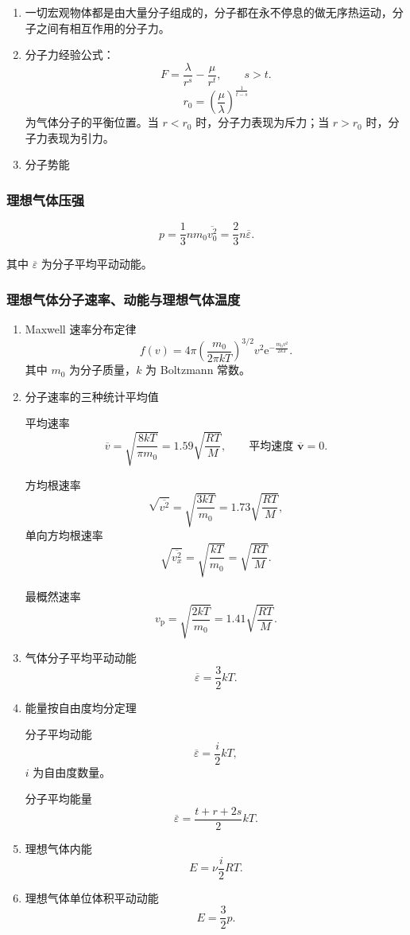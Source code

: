 \documentclass[UTF8,fontset=fandol,zihao=5]{ctexart}
\newcommand{\ee}{\mathrm{e}}
\newcommand{\vect}[1]{\bm{#1}}
\begin{document}
\begin{enumerate}
  \item 一切宏观物体都是由大量分子组成的，分子都在永不停息的做无序热运动，分子之间有相互作用的分子力。
  \item 分子力经验公式：
  \[
    F=\frac{\lambda}{r^s}-\frac{\mu}{r^t},
    \qquad s>t.
  \]
  \[
    r_0=\left(\frac{\mu}{\lambda}\right)^{\frac{1}{t-s}}
  \]
  为气体分子的平衡位置。当 \(r<r_0\) 时，分子力表现为斥力；当 \(r>r_0\) 时，分子力表现为引力。
  \item 分子势能
\end{enumerate}

\subsubsection{理想气体压强}

\[
  p=\frac13nm_0\overline{v_0^2}=\frac23n\overline\varepsilon.
\]

其中 \(\overline\varepsilon\) 为分子平均平动动能。

\subsubsection{理想气体分子速率、动能与理想气体温度}

\begin{enumerate}
  \item Maxwell 速率分布定律
  \[
    f(v)=4\pi\left(\frac{m_0}{2\pi kT}\right)^{3/2}v^2\ee^{-\frac{m_0v^2}{2kT}}.
  \]
  其中 \(m_0\) 为分子质量，\(k\) 为 Boltzmann 常数。

  \item 分子速率的三种统计平均值

  平均速率
  \[
    \overline v=\sqrt{\frac{8kT}{\pi m_0}}=1.59\sqrt{\frac{RT}{M}},
    \qquad
    \text{平均速度 }\overline{\vect v}=0.
  \]

  方均根速率
  \[
    \sqrt{\overline{v^2}}=\sqrt{\frac{3kT}{m_0}}=1.73\sqrt{\frac{RT}{M}},
  \]
  单向方均根速率
  \[
    \sqrt{\overline{v_x^2}}=\sqrt{\frac{kT}{m_0}}=\sqrt{\frac{RT}{M}}.
  \]

  最概然速率
  \[
    v_{\mathrm p}=\sqrt{\frac{2kT}{m_0}}=1.41\sqrt{\frac{RT}{M}}.
  \]

  \item 气体分子平均平动动能
  \[
    \overline\varepsilon=\frac32kT.
  \]

  \item 能量按自由度均分定理

  分子平均动能
  \[
    \overline\varepsilon=\frac i2kT,
  \]
  \(i\) 为自由度数量。

  分子平均能量
  \[
    \overline\varepsilon=\frac{t+r+2s}{2}kT.
  \]

  \item 理想气体内能
  \[
    E=\nu\frac i2RT.
  \]

  \item 理想气体单位体积平动动能
  \[
    E=\frac32p.
  \]
\end{enumerate}
\end{document}
